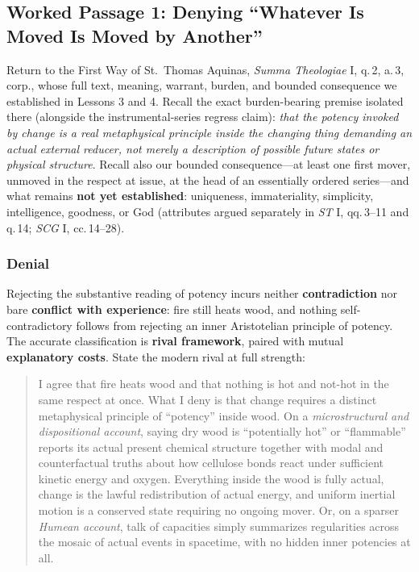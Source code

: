 \subsection{Worked Passage 1: Denying ``Whatever Is Moved Is Moved by Another''}

Return to the First Way of St.\ Thomas Aquinas, \emph{Summa Theologiae} I, q.\,2, a.\,3, corp., whose full text, meaning, warrant, burden, and bounded consequence we established in Lessons 3 and 4. Recall the exact burden-bearing premise isolated there (alongside the instrumental-series regress claim): \emph{that the potency invoked by change is a real metaphysical principle inside the changing thing demanding an actual external reducer, not merely a description of possible future states or physical structure}. Recall also our bounded consequence---at least one first mover, unmoved in the respect at issue, at the head of an essentially ordered series---and what remains \textbf{not yet established}: uniqueness, immateriality, simplicity, intelligence, goodness, or God (attributes argued separately in \emph{ST} I, qq.\,3--11 and q.\,14; \emph{SCG} I, cc.\,14--28).

\subsubsection*{Denial}

Rejecting the substantive reading of potency incurs neither \textbf{contradiction} nor bare \textbf{conflict with experience}: fire still heats wood, and nothing self-contradictory follows from rejecting an inner Aristotelian principle of potency. The accurate classification is \textbf{rival framework}, paired with mutual \textbf{explanatory costs}. State the modern rival at full strength:

\begin{quote}
I agree that fire heats wood and that nothing is hot and not-hot in the same respect at once. What I deny is that change requires a distinct metaphysical principle of ``potency'' inside wood. On a \emph{microstructural and dispositional account}, saying dry wood is ``potentially hot'' or ``flammable'' reports its actual present chemical structure together with modal and counterfactual truths about how cellulose bonds react under sufficient kinetic energy and oxygen. Everything inside the wood is fully actual, change is the lawful redistribution of actual energy, and uniform inertial motion is a conserved state requiring no ongoing mover. Or, on a sparser \emph{Humean account}, talk of capacities simply summarizes regularities across the mosaic of actual events in spacetime, with no hidden inner potencies at all.
\end{quote}

